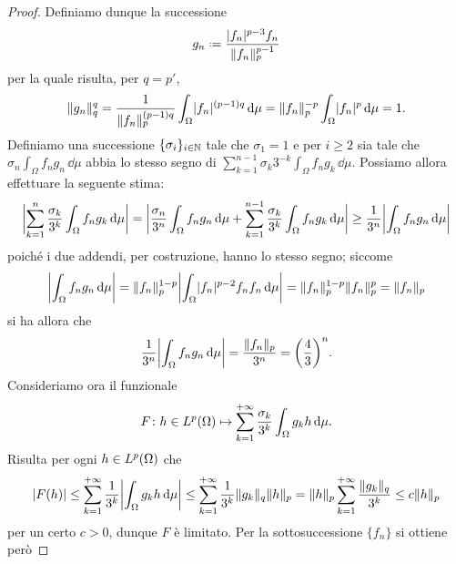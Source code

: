 \begin{proof}
    Definiamo dunque la successione
    \begin{equation}
        g_n\defeq\frac{\abs{f_n}^{p-3}f_n}{\norm{f_n}_p^{p-1}}
    \end{equation}
    per la quale risulta, per $q=p'$,
    \begin{equation}
        \norm{g_n}_q^q=
        \frac1{\norm{f_n}_p^{(p-1)q}}\int_\Omega \abs{f_n}^{(p-1)q}\,\dd\mu=
        \norm{f_n}_p^{-p}\int_\Omega \abs{f_n}^{p}\,\dd\mu=
        1.
    \end{equation}
    Definiamo una successione $\{\sigma_i\}_{i\in\N}$ tale che $\sigma_1=1$ e per $i\ge 2$ sia tale che $\sigma_n\int_\Omega f_ng_n\,\dd\mu$ abbia lo stesso segno di $\sum_{k=1}^{n-1}\sigma_k3^{-k}\int_\Omega f_ng_k\,\dd\mu$.
    Possiamo allora effettuare la seguente stima:
    \begin{equation}
        \abs[\bigg]{\sum_{k=1}^n\frac{\sigma_k}{3^k}\int_\Omega f_ng_k\,\dd\mu}=
        \abs[\bigg]{\frac{\sigma_n}{3^n}\int_\Omega f_ng_n\,\dd\mu+\sum_{k=1}^{n-1}\frac{\sigma_k}{3^k}\int_\Omega f_ng_k\,\dd\mu}\ge
        \frac1{3^n}\abs[\bigg]{\int_\Omega f_ng_n\,\dd\mu}
    \end{equation}
    poich\'e i due addendi, per costruzione, hanno lo stesso segno; siccome
    \begin{equation}
        \abs[\bigg]{\int_\Omega f_ng_n\,\dd\mu}=
        \norm{f_n}_p^{1-p}\abs[\bigg]{\int_\Omega \abs{f_n}^{p-2}f_nf_n\,\dd\mu}=
        \norm{f_n}_p^{1-p}\norm{f_n}_p^p=
        \norm{f_n}_p
    \end{equation}
    si ha allora che
    \begin{equation}
        \frac1{3^n}\abs[\bigg]{\int_\Omega f_ng_n\,\dd\mu}=
        \frac{\norm{f_n}_p}{3^n}=\biggl(\frac43\biggr)^n.
    \end{equation}
    Consideriamo ora il funzionale
    \begin{equation}
        F\colon h\in\leb[p]{\Omega}\mapsto\sum_{k=1}^{+\infty}\frac{\sigma_k}{3^k}\int_\Omega g_kh\,\dd\mu.
    \end{equation}
    Risulta per ogni $h\in\leb[p]{\Omega}$ che
    \begin{equation}
        \abs{F(h)}\le
        \sum_{k=1}^{+\infty}\frac1{3^k}\abs[\bigg]{\int_\Omega g_kh\,\dd\mu}\le
        \sum_{k=1}^{+\infty}\frac1{3^k}\norm{g_k}_q\norm{h}_p=
        \norm{h}_p\sum_{k=1}^{+\infty}\frac{\norm{g_k}_q}{3^k}\le
        c\norm{h}_p
    \end{equation}
    per un certo $c>0$, dunque $F$ è limitato.
    Per la sottosuccessione $\{f_n\}$ si ottiene però

\end{proof}
